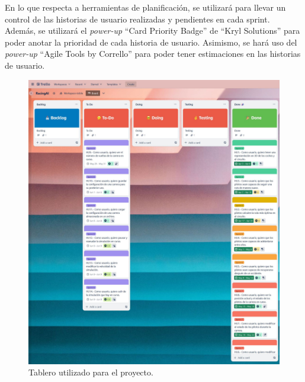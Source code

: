 En lo que respecta a herramientas de planificación, se utilizará \planApp para llevar un control de las historias de usuario realizadas y pendientes en cada sprint. Además, se utilizará el \textit{power-up} ``Card Priority Badge'' de ``Kryl Solutions'' para poder anotar la prioridad de cada historia de usuario. Asimismo, se hará uso del \textit{power-up} ``Agile Tools by Corrello'' para poder tener estimaciones en las historias de usuario.

\begin{figure}[H]
    \centering
    \includegraphics[width=\textwidth]{imagenes/converted/trello-mio.jpg}
    \caption{Tablero utilizado para el proyecto.}
\end{figure}

\newpage

